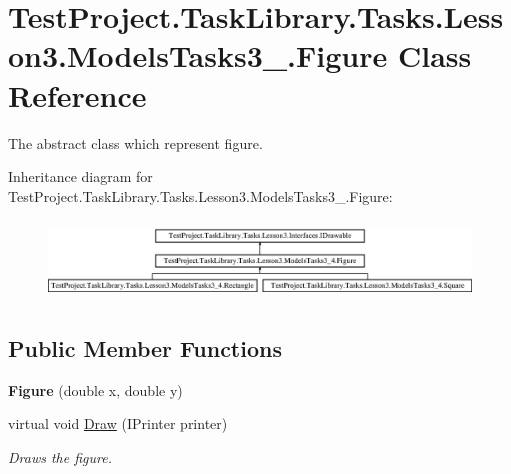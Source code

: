 \hypertarget{class_test_project_1_1_task_library_1_1_tasks_1_1_lesson3_1_1_models_tasks3__4_1_1_figure}{}\section{Test\+Project.\+Task\+Library.\+Tasks.\+Lesson3.\+Models\+Tasks3\+\_.\+Figure Class Reference}
\label{class_test_project_1_1_task_library_1_1_tasks_1_1_lesson3_1_1_models_tasks3__4_1_1_figure}


The abstract class which represent figure.  


Inheritance diagram for Test\+Project.\+Task\+Library.\+Tasks.\+Lesson3.\+Models\+Tasks3\+\_.\+Figure\+:\begin{figure}[H]
\begin{center}
\leavevmode
\includegraphics[height=2.105263cm]{class_test_project_1_1_task_library_1_1_tasks_1_1_lesson3_1_1_models_tasks3__4_1_1_figure}
\end{center}
\end{figure}
\subsection*{Public Member Functions}
\begin{DoxyCompactItemize}
\item 
\mbox{\label{class_test_project_1_1_task_library_1_1_tasks_1_1_lesson3_1_1_models_tasks3__4_1_1_figure_a03ff639b14adc41ce9e7edac1fd9aa77}} 
{\bfseries Figure} (double x, double y)
\item 
virtual void \mbox{\hyperlink{class_test_project_1_1_task_library_1_1_tasks_1_1_lesson3_1_1_models_tasks3__4_1_1_figure_a27545f8077537a70f0ac982adb5e95c8}{Draw}} (I\+Printer printer)
\begin{DoxyCompactList}\small\item\em Draws the figure. \end{DoxyCompactList}\end{DoxyCompactItemize}
